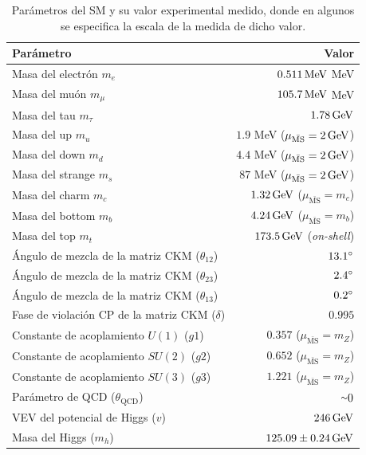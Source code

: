 \begin{table} 
	
	\centering
	\caption{Parámetros del SM y su valor experimental medido, donde en algunos se especifica la escala de la medida de dicho valor.}
	\begin{tabular}{ l | r }

	\hline	
	\hline

		Parámetro & Valor \\

		\hline
		\hline

    Masa del electrón $m_e$ & $0.511\,\text{MeV}$ MeV \\
    Masa del muón $m_{\mu}$ & $105.7\,\text{MeV}$ MeV \\
    Masa del tau $m_{\tau}$ & $1.78\,\text{GeV}$ \\
    Masa del up $m_u$ & $1.9$ MeV ($\mu_{\bar{\text{MS}}}=2\,\text{GeV}$) \\
    Masa del down $m_d$ & $4.4$ MeV ($\mu_{\bar{\text{MS}}}=2\,\text{GeV}$) \\
    Masa del strange $m_s$ & $87$ MeV ($\mu_{\bar{\text{MS}}}=2\,\text{GeV}$) \\
    Masa del charm $m_c$ & $1.32\,\text{GeV}$ ($\mu_{\bar{\text{MS}}} = m_c$) \\
    Masa del bottom $m_b$ & $4.24\,\text{GeV}$ ($\mu_{\bar{\text{MS}}} = m_b$) \\
    Masa del top $m_t$ & $173.5\,\text{GeV}$ (\textit{on-shell})\\
    Ángulo de mezcla de la matriz CKM ($\theta_{12}$) & $13.1\degree$ \\
    Ángulo de mezcla de la matriz CKM ($\theta_{23}$) & $2.4\degree$ \\
    Ángulo de mezcla de la matriz CKM ($\theta_{13}$) & $0.2\degree$ \\
    Fase de violación CP de la matriz CKM ($\delta$) & $0.995$ \\
    Constante de acoplamiento $U(1)$ ($g1$) & $0.357$ ($\mu_{\bar{\text{MS}}} = m_Z$) \\
    Constante de acoplamiento $SU(2)$ ($g2$) & $0.652$ ($\mu_{\bar{\text{MS}}} = m_Z$) \\
    Constante de acoplamiento $SU(3)$ ($g3$) & $1.221$ ($\mu_{\bar{\text{MS}}} = m_Z$) \\
    Parámetro de QCD ($\theta_{\text{QCD}}$) & ${\smallsim}0$ \\
    VEV del potencial de Higgs ($v$) & $246\,\text{GeV}$ \\
    Masa del Higgs ($m_h$) & $125.09\pm0.24\,\text{GeV}$ \\

    \hline
    \hline

	\end{tabular}
	\label{tab:sm_para}
\end{table}


